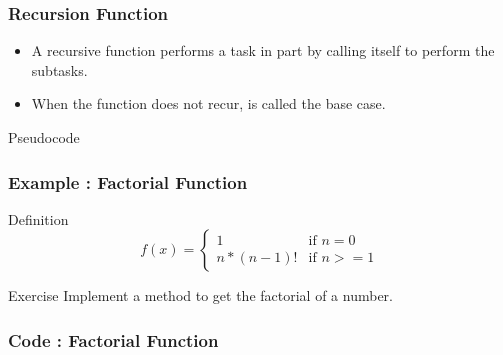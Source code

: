\documentclass{beamer}
\begin{document}
\begin{frame}
\frametitle{Recursion Function}
\begin{itemize}
\item A recursive function performs a task in part by calling itself to perform the subtasks.
\item When the function does not recur, is called the base case.
\end{itemize}

\begin{block}{Pseudocode}
\begin{algorithmic}
\Else
\EndIf
\end{algorithmic}
\end{block}

\end{frame}

\begin{frame}
\frametitle{Example : Factorial Function}
\begin{block}{Definition}
\[
  f(x) =
  \begin{cases}
  	1    		& \text{if $n=0$} \\
      	n*(n-1)! & \text{if $n>=1$} 
  \end{cases}
\]
\end{block}

\begin{block}{Exercise}
Implement a method to get the factorial of a number.
\end{block}

\end{frame}


\begin{frame}
\frametitle{Code : Factorial Function}

\end{frame}
\end{document}
